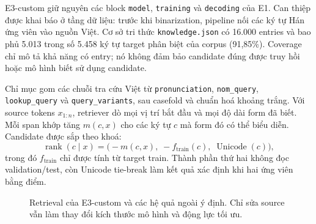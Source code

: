 E3-custom giữ nguyên các block \texttt{model}, \texttt{training} và
\texttt{decoding} của E1. Can thiệp được khai báo ở tầng dữ liệu: trước khi
binarization, pipeline nối các ký tự Hán ứng viên vào nguồn Việt. Cơ sở tri
thức \texttt{knowledge.json} có 16.000 entries và bao phủ 5.013 trong số
5.458 ký tự target phân biệt của corpus (91,85\%). Coverage chỉ mô tả khả năng
có entry; nó không đảm bảo candidate đúng được truy hồi hoặc mô hình biết sử
dụng candidate.

Chỉ mục gom các chuỗi tra cứu Việt từ \texttt{pronunciation},
\texttt{nom\_query}, \texttt{lookup\_\allowbreak query} và
\texttt{query\_\allowbreak variants}, sau
casefold và chuẩn hoá khoảng trắng. Với source tokens $x_{1:n}$, retriever dò
mọi vị trí bắt đầu và mọi độ dài form đã biết. Mỗi span khớp tăng $m(c,x)$ cho
các ký tự $c$ mà form đó có thể biểu diễn. Candidate được sắp theo khoá:
\begin{equation}
  \operatorname{rank}(c\mid x)
  = \bigl(-m(c,x),\;-f_{\mathrm{train}}(c),\;\operatorname{Unicode}(c)\bigr),
  \label{eq:retrieval-rank}
\end{equation}
trong đó $f_{\mathrm{train}}$ chỉ được tính từ target train. Thành phần thứ hai
không đọc validation/test, còn Unicode tie-break làm kết quả xác định khi hai
ứng viên bằng điểm.

\begin{figure}[tbp]
  \centering
  \caption{Retrieval của E3-custom và các hệ quả ngoài ý định. Chỉ sửa source
  vẫn làm thay đổi kích thước mô hình và động lực tối ưu.}
  \label{fig:knowledge-retrieval}
\end{figure}

